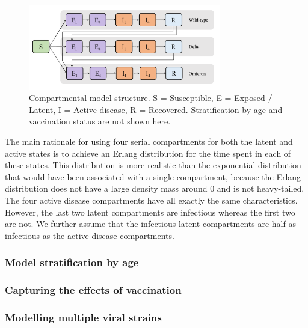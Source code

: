 \begin{figure}[ht]
    \begin{center}
    \includegraphics[width=0.75\textwidth]{../../tex_descriptions/models/sm_covid/sm_covid_se4i4r.pdf}
    \end{center}
    \caption{Compartmental model structure. 
    S = Susceptible, E = Exposed / Latent, I = Active disease, R = Recovered.
    Stratification by age and vaccination status are not shown here.
    } 
    \label{fig:se4i4r}
\end{figure}

The main rationale for using four serial compartments for both the latent and active states is to achieve an Erlang distribution for the time spent in each of these states. This distribution is more realistic than
the exponential distribution that would have been associated with a single compartment, because the Erlang distribution does not have a large density mass around 0 and is not heavy-tailed. 
The four active disease compartments have all exactly the same characteristics. However, the last two latent compartments are infectious whereas the first two are not. We further assume that 
the infectious latent compartments are half as infectious as the active disease compartments.

\subsubsection{Model stratification by age}


\subsubsection{Capturing the effects of vaccination}


\subsubsection{Modelling multiple viral strains}
 



